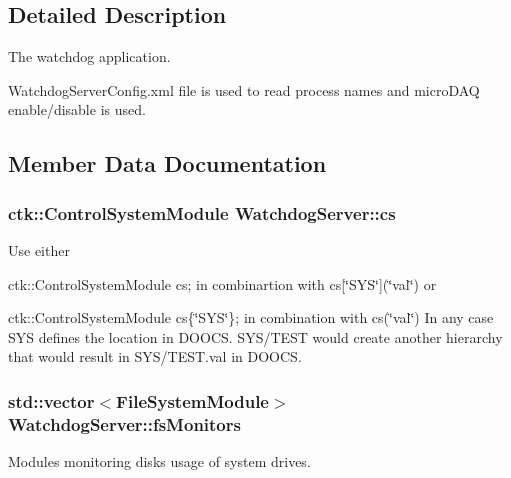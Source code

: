 \subsection{Detailed Description}
The watchdog application. 

Watchdog\+Server\+Config.\+xml file is used to read process names and micro\+D\+AQ enable/disable is used. 

\subsection{Member Data Documentation}
\subsubsection[{\texorpdfstring{cs}{cs}}]{\setlength{\rightskip}{0pt plus 5cm}ctk\+::\+Control\+System\+Module Watchdog\+Server\+::cs}\hypertarget{structWatchdogServer_ac2a80d4a412c142f8d4753b51e12bfa3}{}\label{structWatchdogServer_ac2a80d4a412c142f8d4753b51e12bfa3}
Use either
\begin{DoxyItemize}
\item ctk\+::\+Control\+System\+Module cs; in combinartion with cs\mbox{[}\char`\"{}\+S\+Y\+S\char`\"{}\mbox{]}(\char`\"{}val\char`\"{}) or
\item ctk\+::\+Control\+System\+Module cs\{\char`\"{}\+S\+Y\+S\char`\"{}\}; in combination with cs(\char`\"{}val\char`\"{}) In any case S\+YS defines the location in D\+O\+O\+CS. S\+Y\+S/\+T\+E\+ST would create another hierarchy that would result in S\+Y\+S/\+T\+E\+S\+T.\+val in D\+O\+O\+CS. 
\end{DoxyItemize}
\subsubsection[{\texorpdfstring{fs\+Monitors}{fsMonitors}}]{\setlength{\rightskip}{0pt plus 5cm}std\+::vector$<${\bf File\+System\+Module}$>$ Watchdog\+Server\+::fs\+Monitors}\hypertarget{structWatchdogServer_a6dea91943e4456bf4ca8f9f4995ec6d2}{}\label{structWatchdogServer_a6dea91943e4456bf4ca8f9f4995ec6d2}
Modules monitoring disks usage of system drives. 
